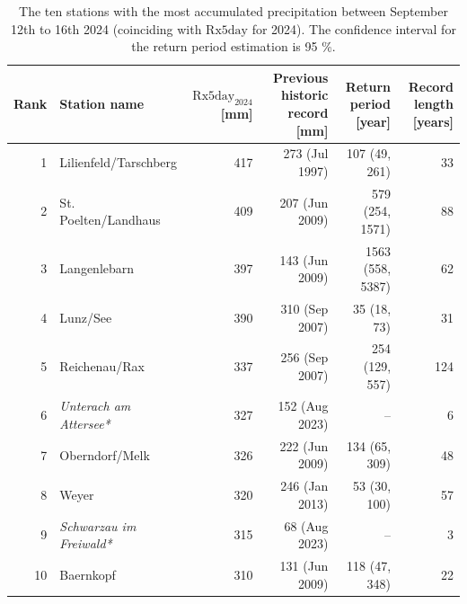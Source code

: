 \begin{table}[!ht]
    \centering
    \caption{The ten stations with the most accumulated precipitation between September 12th to 16th 2024 (coinciding with $\text{Rx5day}$ for 2024). The confidence interval for the return period estimation is 95 \unit{\%}. }
    \label{tab1}
    \begin{tabular}{rlrrrr}
    Rank & Station name & $\text{Rx5day}_{\text{2024}}$ [mm] & Previous historic record [mm] & Return period [year] & Record length [years] \\ \hline
    1 & Lilienfeld/Tarschberg & 417 & 273 (Jul 1997) & 107 (49, 261) & 33 \\
    2 & St. Poelten/Landhaus  & 409 & 207 (Jun 2009) & 579 (254, 1571) & 88 \\
    3 & Langenlebarn          & 397 & 143 (Jun 2009) & 1563 (558, 5387) & 62 \\ 
    4 & Lunz/See              & 390 & 310 (Sep 2007) & 35 (18, 73) & 31 \\ 
    5 & Reichenau/Rax         & 337 & 256 (Sep 2007) & 254 (129, 557) & 124 \\ 
    6 & \textit{Unterach am Attersee*}  & 327 & 152 (Aug 2023) & -- & 6 \\ 
    7 & Oberndorf/Melk        & 326 & 222 (Jun 2009) & 134 (65, 309) & 48 \\ 
    8 & Weyer                 & 320 & 246 (Jan 2013) & 53 (30, 100) & 57 \\ 
    9 & \textit{Schwarzau im Freiwald*} & 315 &  68 (Aug 2023) & -- & 3 \\ 
    10 & Baernkopf            & 310 & 131 (Jun 2009) & 118 (47, 348) & 22 \\ \hline
    \end{tabular}
\end{table}